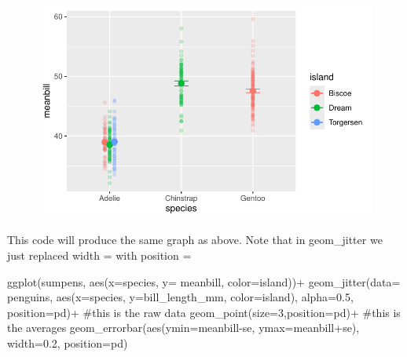 \documentclass[
  letterpaper,
  DIV=11,
  numbers=noendperiod]{scrartcl}
\newenvironment{Shaded}{\begin{snugshade}}{\end{snugshade}}
\newcommand{\AttributeTok}[1]{\textcolor[rgb]{0.40,0.45,0.13}{#1}}
\newcommand{\CommentTok}[1]{\textcolor[rgb]{0.37,0.37,0.37}{#1}}
\newcommand{\DecValTok}[1]{\textcolor[rgb]{0.68,0.00,0.00}{#1}}
\newcommand{\FloatTok}[1]{\textcolor[rgb]{0.68,0.00,0.00}{#1}}
\newcommand{\FunctionTok}[1]{\textcolor[rgb]{0.28,0.35,0.67}{#1}}
\newcommand{\NormalTok}[1]{\textcolor[rgb]{0.00,0.23,0.31}{#1}}
\newcommand{\SpecialCharTok}[1]{\textcolor[rgb]{0.37,0.37,0.37}{#1}}
\begin{document}
\begin{figure}[H]

{\centering \includegraphics{Lab_2_files/figure-pdf/unnamed-chunk-20-1.pdf}

}

\end{figure}

This code will produce the same graph as above. Note that in
geom\_jitter we just replaced width = with position =

\begin{Shaded}
\begin{Highlighting}[]
\FunctionTok{ggplot}\NormalTok{(sumpens, }\FunctionTok{aes}\NormalTok{(}\AttributeTok{x=}\NormalTok{species, }\AttributeTok{y=}\NormalTok{ meanbill, }\AttributeTok{color=}\NormalTok{island))}\SpecialCharTok{+}
  \FunctionTok{geom\_jitter}\NormalTok{(}\AttributeTok{data=}\NormalTok{ penguins, }\FunctionTok{aes}\NormalTok{(}\AttributeTok{x=}\NormalTok{species, }\AttributeTok{y=}\NormalTok{bill\_length\_mm, }\AttributeTok{color=}\NormalTok{island), }\AttributeTok{alpha=}\FloatTok{0.5}\NormalTok{, }\AttributeTok{position=}\NormalTok{pd)}\SpecialCharTok{+} \CommentTok{\#this is the raw data}
  \FunctionTok{geom\_point}\NormalTok{(}\AttributeTok{size=}\DecValTok{3}\NormalTok{,}\AttributeTok{position=}\NormalTok{pd)}\SpecialCharTok{+} \CommentTok{\#this is the averages}
  \FunctionTok{geom\_errorbar}\NormalTok{(}\FunctionTok{aes}\NormalTok{(}\AttributeTok{ymin=}\NormalTok{meanbill}\SpecialCharTok{{-}}\NormalTok{se, }\AttributeTok{ymax=}\NormalTok{meanbill}\SpecialCharTok{+}\NormalTok{se), }\AttributeTok{width=}\FloatTok{0.2}\NormalTok{, }\AttributeTok{position=}\NormalTok{pd)}
\end{Highlighting}
\end{Shaded}
\end{document}
